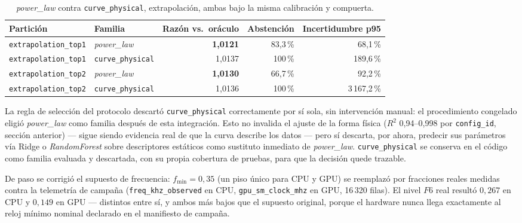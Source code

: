 \documentclass[12pt,oneside,spanish]{book}
\begin{document}
\begin{table}[H]
\centering
\caption[Curva física bajo compuerta de abstención honesta]{\textit{power\_law} contra \texttt{curve\_physical}, extrapolación, ambas bajo la misma calibración y compuerta.}
\label{tab:r3-curva-integrada}
\begin{tabular}{llrrr}
\toprule
\textbf{Partición} & \textbf{Familia} & \textbf{Razón vs.\ oráculo} & \textbf{Abstención} & \textbf{Incertidumbre p95} \\
\midrule
\texttt{extrapolation\_top1} & \textit{power\_law}     & \textbf{1,0121} & 83,3\,\% & 68,1\,\%     \\
\texttt{extrapolation\_top1} & \texttt{curve\_physical} & 1,0137          & 100\,\%  & 189,6\,\%    \\
\texttt{extrapolation\_top2} & \textit{power\_law}     & \textbf{1,0130} & 66,7\,\% & 92,2\,\%     \\
\texttt{extrapolation\_top2} & \texttt{curve\_physical} & 1,0136          & 100\,\%  & 3\,167,2\,\% \\
\bottomrule
\end{tabular}
\end{table}

La regla de selección del protocolo descartó \texttt{curve\_physical} correctamente por sí sola, sin intervención manual: el procedimiento congelado eligió \textit{power\_law} como familia después de esta integración. Esto no invalida el ajuste de la forma física ($R^2$ 0,94--0,998 por \texttt{config\_id}, sección anterior) --- sigue siendo evidencia real de que la curva describe los datos --- pero sí descarta, por ahora, predecir sus parámetros vía Ridge o \textit{RandomForest} sobre descriptores estáticos como sustituto inmediato de \textit{power\_law}. \texttt{curve\_physical} se conserva en el código como familia evaluada y descartada, con su propia cobertura de pruebas, para que la decisión quede trazable.

De paso se corrigió el supuesto de frecuencia: $f_{\min}=0{,}35$ (un piso único para CPU y GPU) se reemplazó por fracciones reales medidas contra la telemetría de campaña (\texttt{freq\_khz\_observed} en CPU, \texttt{gpu\_sm\_clock\_mhz} en GPU, 16\,320 filas). El nivel $F6$ real resultó $0{,}267$ en CPU y $0{,}149$ en GPU --- distintos entre sí, y ambos más bajos que el supuesto original, porque el hardware nunca llega exactamente al reloj mínimo nominal declarado en el manifiesto de campaña.
\end{document}

